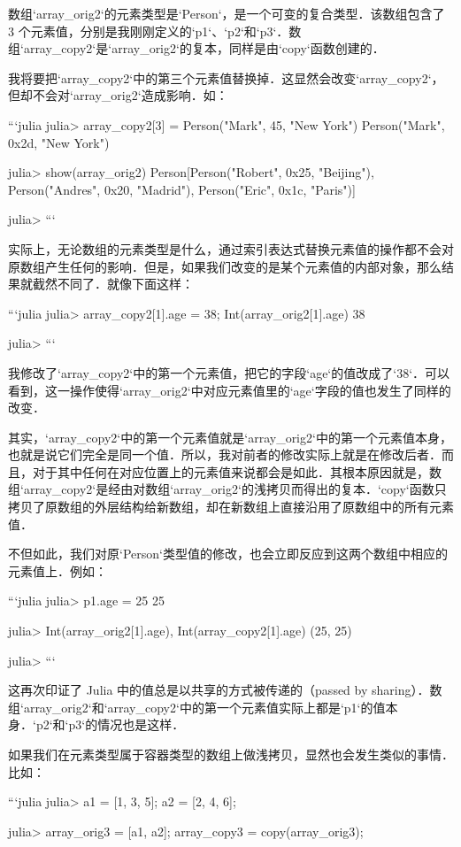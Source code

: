 数组`array_orig2`的元素类型是`Person`，是一个可变的复合类型．该数组包含了 3 个元素值，分别是我刚刚定义的`p1`、`p2`和`p3`．数组`array_copy2`是`array_orig2`的复本，同样是由`copy`函数创建的．

我将要把`array_copy2`中的第三个元素值替换掉．这显然会改变`array_copy2`，但却不会对`array_orig2`造成影响．如：

```julia
julia> array_copy2[3] = Person("Mark", 45, "New York")
Person("Mark", 0x2d, "New York")

julia> show(array_orig2)
Person[Person("Robert", 0x25, "Beijing"), Person("Andres", 0x20, "Madrid"), Person("Eric", 0x1c, "Paris")]

julia> 
```

实际上，无论数组的元素类型是什么，通过索引表达式替换元素值的操作都不会对原数组产生任何的影响．但是，如果我们改变的是某个元素值的内部对象，那么结果就截然不同了．就像下面这样：

```julia
julia> array_copy2[1].age = 38; Int(array_orig2[1].age)
38

julia> 
```

我修改了`array_copy2`中的第一个元素值，把它的字段`age`的值改成了`38`．可以看到，这一操作使得`array_orig2`中对应元素值里的`age`字段的值也发生了同样的改变．

其实，`array_copy2`中的第一个元素值就是`array_orig2`中的第一个元素值本身，也就是说它们完全是同一个值．所以，我对前者的修改实际上就是在修改后者．而且，对于其中任何在对应位置上的元素值来说都会是如此．其根本原因就是，数组`array_copy2`是经由对数组`array_orig2`的浅拷贝而得出的复本．`copy`函数只拷贝了原数组的外层结构给新数组，却在新数组上直接沿用了原数组中的所有元素值．

不但如此，我们对原`Person`类型值的修改，也会立即反应到这两个数组中相应的元素值上．例如：

```julia
julia> p1.age = 25
25

julia> Int(array_orig2[1].age), Int(array_copy2[1].age)
(25, 25)

julia> 
```

这再次印证了 Julia 中的值总是以共享的方式被传递的（passed by sharing）．数组`array_orig2`和`array_copy2`中的第一个元素值实际上都是`p1`的值本身．`p2`和`p3`的情况也是这样．

如果我们在元素类型属于容器类型的数组上做浅拷贝，显然也会发生类似的事情．比如：

```julia
julia> a1 = [1, 3, 5]; a2 = [2, 4, 6];

julia> array_orig3 = [a1, a2]; array_copy3 = copy(array_orig3);

